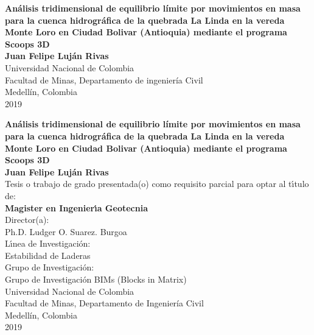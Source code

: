 \begin{center}
\begin{figure}
\centering%
%
\end{figure}
\thispagestyle{empty} \vspace*{1.5cm} \textbf{\huge
An\'{a}lisis tridimensional de equilibrio l\'{i}mite por movimientos en masa para la cuenca hidrogr\'{a}fica de la quebrada La Linda en la vereda Monte Loro en Ciudad Bolivar (Antioquia) mediante el programa Scoops 3D}\\[4.0cm]
\Large\textbf{Juan Felipe Luj\'{a}n Rivas}\\[4.0cm]
\small Universidad Nacional de Colombia\\
Facultad de Minas, Departamento de ingenier\'{i}a Civil \\
Medell\'{i}n, Colombia\\
2019\\
\end{center}

\newpage{\pagestyle{empty}\cleardoublepage}

\newpage
\begin{center}
\thispagestyle{empty} \vspace*{0cm} \textbf{\huge
An\'{a}lisis tridimensional de equilibrio l\'{i}mite por movimientos en masa para la cuenca hidrogr\'{a}fica de la quebrada La Linda en la vereda Monte Loro en Ciudad Bolivar (Antioquia) mediante el programa Scoops 3D}\\[2.0cm]
\Large\textbf{Juan Felipe Luj\'{a}n Rivas}\\[2.0cm]
\small Tesis o trabajo de grado presentada(o) como requisito parcial para optar al
t\'{\i}tulo de:\\
\textbf{ Magister en Ingenier\'{\i}a Geotecnia}\\[1.5cm]
Director(a):\\
Ph.D. Ludger O. Suarez. Burgoa\\[1.0cm]
L\'{\i}nea de Investigaci\'{o}n:\\
Estabilidad de Laderas\\
Grupo de Investigaci\'{o}n:\\
Grupo de Investigaci\'{o}n BIMs (Blocks in Matrix)\\[0.5cm]
Universidad Nacional de Colombia\\
Facultad de Minas, Departamento de Ingenier\'{i}a Civil\\
Medell\'in, Colombia\\
2019\\
\end{center}



